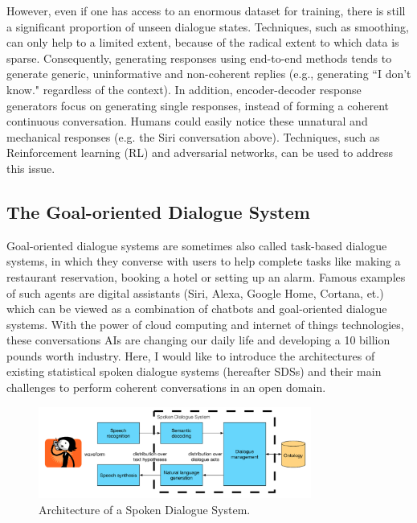\documentclass[bsc,frontabs,twoside,singlespacing,parskip,deptreport]{infthesis}     %
\begin{document}
However, even if one has access to an enormous dataset for training, there is still a significant proportion of unseen dialogue states. Techniques, such as smoothing, can only help to a limited extent, because of the radical extent to which data is sparse. Consequently, generating responses using end-to-end methods tends to generate generic, uninformative and non-coherent replies (e.g., generating ``I don’t know." regardless of the context). In addition, encoder-decoder response generators focus on generating single responses, instead of forming a coherent continuous conversation\cite{jurafsky2019speech}. Humans could easily notice these unnatural and mechanical responses (e.g. the Siri conversation above). Techniques, such as Reinforcement learning (RL)\cite{li2016deep} and adversarial networks\cite{li2017adversarial}, can be used to address this issue.

\subsection{The Goal-oriented Dialogue System}

 Goal-oriented dialogue systems are sometimes also called task-based dialogue systems, in which they converse with users to help complete tasks like making a restaurant reservation, booking a hotel or setting up an alarm. Famous examples of such agents are digital assistants (Siri, Alexa, Google Home, Cortana, et.)\cite{siri,alexa,googlehome,cortana} which can be viewed as a combination of chatbots and goal-oriented dialogue systems. With the power of cloud computing and internet of things technologies, these conversations AIs are changing our daily life and developing a 10 billion pounds worth industry\cite{chatbotmarket}. Here, I would like to introduce the architectures of existing statistical spoken dialogue systems (hereafter SDSs) and their main challenges to perform coherent conversations in an open domain. 

\begin{figure}[h]
    \centering
    \includegraphics[width=0.80\textwidth]{sds.png}
    \caption{Architecture of a Spoken Dialogue System.\cite{gasic}}
    \label{fig:sds}
\end{figure}
\end{document}
